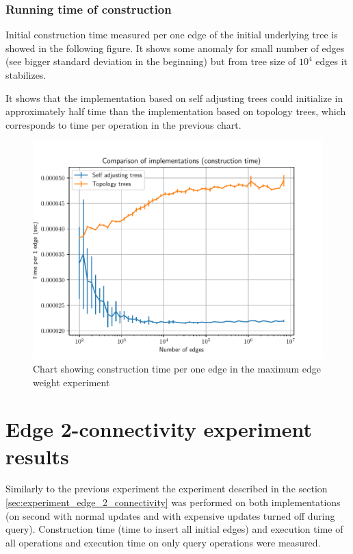 \vfill\eject %

\subsubsection{Running time of construction}

Initial construction time measured per one edge of the initial underlying tree
is showed in the following figure. It shows some anomaly for small number of
edges (see bigger standard deviation in the beginning) but from tree size of
$10^4$ edges it stabilizes.

It shows that the implementation based on self adjusting trees could initialize
in approximately half time than the implementation based on topology trees,
which corresponds to time per operation in the previous chart.

\begin{figure}[H]
\centering
{}\hsize
\includegraphics[width=\hsize]{charts/maximum_edge_weight_construction.pdf}
\caption{Chart showing construction time per one edge in the maximum edge weight
experiment}
\end{figure}

\vfill\eject %

\section{Edge 2-connectivity experiment results}
\label{sec:results_edge_2_connectivity}

Similarly to the previous experiment the experiment described in the section
\ref{sec:experiment_edge_2_connectivity} was performed on both implementations
(on second with normal updates and with expensive updates turned off during
query). Construction time (time to insert all initial edges) and execution time
of all operations and execution time on only query operations were measured.


